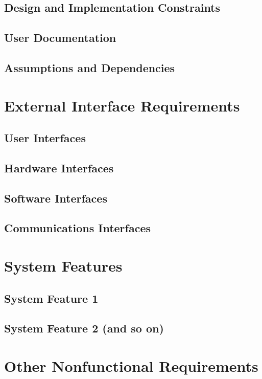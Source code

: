 \documentclass[letterpaper,12pt]{article}
\begin{document}
\subsection{\Large Design and Implementation Constraints}
\subsection{\Large User Documentation}
\subsection{\Large Assumptions and Dependencies}

\pagebreak

\section{\LARGE External Interface Requirements}
\subsection{\Large User Interfaces}
\subsection{\Large Hardware Interfaces}
\subsection{\Large Software Interfaces}
\subsection{\Large Communications Interfaces}

\section{\LARGE System Features}
\subsection{\Large System Feature 1}
\subsection{\Large System Feature 2 (and so on)}

\pagebreak

\section{\LARGE Other Nonfunctional Requirements}
\end{document}
